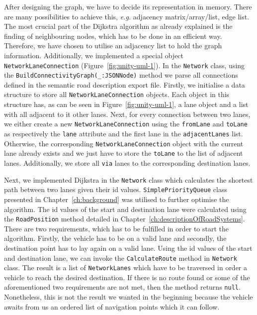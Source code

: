 After designing the graph, we have to decide its representation in memory. There are many possibilities to achieve this, \emph{e.g.} adjacency matrix/array/list, edge list. The most crucial part of the Dijkstra algorithm as already explained is the finding of neighbouring nodes, which has to be done in an efficient way. Therefore, we have chosen to utilise an adjacency list to hold the graph information. Additionally, we implemented a special object \texttt{NetworkLaneConnection} (Figure~\ref{fig:unity-uml-1}). In the \texttt{Network} class, using the \texttt{BuildConnectivityGraph(\_:\;JSONNode)} method we parse all connections defined in the semantic road description export file. Firstly, we initialise a data structure to store all \texttt{NetworkLaneConnection} objects. Each object in this structure has, as can be seen in Figure~\ref{fig:unity-uml-1}, a lane object and a list with all adjacent to it other lanes. Next, for every connection between two lanes, we either create a new \texttt{NetworkLaneConnection} using the \texttt{fromLane} and \texttt{toLane} as respectively the \texttt{lane} attribute and the first lane in the \texttt{adjacentLanes} list. Otherwise, the corresponding \texttt{NetworkLaneConnection} object with the current lane already exists and we just have to store the \texttt{toLane} to the list of adjacent lanes. Additionally, we store all \texttt{via} lanes to the corresponding destination lanes.

Next, we implemented Dijkstra in the \texttt{Network} class which calculates the shortest path between two lanes given their id values. \texttt{SimplePriorityQueue} class presented in Chapter~\ref{ch:background} was utilised to further optimise the algorithm. The id values of the start and destination lane were calculated using the \texttt{RoadPosition} method detailed in Chapter~\ref{ch:descriptionOfRoadSystems}. There are two requirements, which has to be fulfilled in order to start the algorithm. Firstly, the vehicle has to be on a valid lane and secondly, the destination point has to lay again on a valid lane. Using the id values of the start and destination lane, we can invoke the \texttt{CalculateRoute} method in \texttt{Network} class. The result is a list of \texttt{NetworkLanes} which have to be traversed in order a vehicle to reach the desired destination. If there is no route found or some of the aforementioned two requirements are not met, then the method returns \texttt{null}. Nonetheless, this is not the result we wanted in the beginning because the vehicle awaits from us an ordered list of navigation points which it can follow.\\

